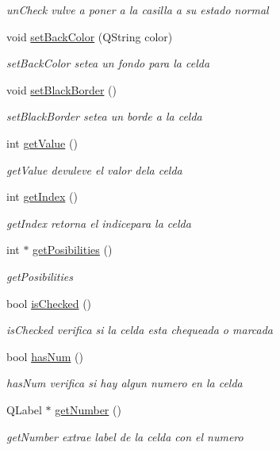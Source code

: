 \begin{DoxyCompactItemize}
\begin{DoxyCompactList}\small\item\em un\-Check vulve a poner a la casilla a su estado normal \end{DoxyCompactList}\item 
void \hyperlink{class_celda_af18a6e990908532034599a49784d4ff5}{set\-Back\-Color} (Q\-String color)
\begin{DoxyCompactList}\small\item\em set\-Back\-Color setea un fondo para la celda \end{DoxyCompactList}\item 
\hypertarget{class_celda_ac56176d091cbca011a1d93530f179800}{void \hyperlink{class_celda_ac56176d091cbca011a1d93530f179800}{set\-Black\-Border} ()}\label{class_celda_ac56176d091cbca011a1d93530f179800}

\begin{DoxyCompactList}\small\item\em set\-Black\-Border setea un borde a la celda \end{DoxyCompactList}\item 
int \hyperlink{class_celda_aa37c81071e8d384b46661d30e30d9e3e}{get\-Value} ()
\begin{DoxyCompactList}\small\item\em get\-Value devuleve el valor dela celda \end{DoxyCompactList}\item 
int \hyperlink{class_celda_a7e16d4f745601f63ac8e5178bc0f4e54}{get\-Index} ()
\begin{DoxyCompactList}\small\item\em get\-Index retorna el indicepara la celda \end{DoxyCompactList}\item 
int $\ast$ \hyperlink{class_celda_a1018c36394dd882c632a71c7fb12999a}{get\-Posibilities} ()
\begin{DoxyCompactList}\small\item\em get\-Posibilities \end{DoxyCompactList}\item 
bool \hyperlink{class_celda_a592dd2bcba1d493d884c90b47fdadf00}{is\-Checked} ()
\begin{DoxyCompactList}\small\item\em is\-Checked verifica si la celda esta chequeada o marcada \end{DoxyCompactList}\item 
bool \hyperlink{class_celda_ab6966d037ddd5e0c1bb99aca39647379}{has\-Num} ()
\begin{DoxyCompactList}\small\item\em has\-Num verifica si hay algun numero en la celda \end{DoxyCompactList}\item 
Q\-Label $\ast$ \hyperlink{class_celda_a9de72cff68e6b39fb062b4a3d386f627}{get\-Number} ()
\begin{DoxyCompactList}\small\item\em get\-Number extrae label de la celda con el numero \end{DoxyCompactList}\end{DoxyCompactItemize}
